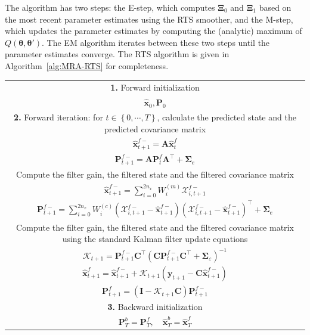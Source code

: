 \documentclass[review,authoryear,3p]{elsarticle}
\begin{document}
The algorithm has two steps: the E-step, which computes $\boldsymbol\Xi_0$ and $\boldsymbol\Xi_1$ based on the most recent parameter estimates using the RTS smoother, and the M-step, which updates the parameter estimates by computing the (analytic) maximum of $Q(\boldsymbol\theta,\boldsymbol\theta')$. The EM algorithm iterates between these two steps until the parameter estimates converge. The RTS  algorithm is given in Algorithm~\ref{alg:MRA-RTS} for completeness. 
\renewcommand{\arraystretch}{1.7}
\begin{table}[!ht]
\begin{tabular}{|c|}\hline
\multicolumn{1}{|p{16cm}|}{\textbf{1.} Forward initialization} \\ 
$\hat{\mathbf x}_0, \mathbf P_0$ \\
\hline
\multicolumn{1}{|p{16cm}|}{\textbf{2.} Forward iteration: for $t\in\left\lbrace 0,\cdots,T\right\rbrace $, calculate the predicted state and the predicted covariance matrix } \\
$\hat{\mathbf x}_{t+1}^{f-}=\mathbf A \hat{\mathbf x}_{t}^{f}$  \\ 
$\mathbf P_{t+1}^{f-}=\mathbf A \mathbf P_{t}^{f}\mathbf A^{\top}+\boldsymbol\Sigma_e$  \\
\multicolumn{1}{|p{16cm}|}{Compute the filter gain, the filtered state and the filtered covariance matrix} \\
$\hat{\mathbf x}_{t+1}^{f-}=\sum_{i=0}^{2n_x} W_i^{(m)}\mathcal X_{i,t+1}^{f-} $ \\
$\mathbf P_{t +1}^{f-}=\sum_{i=0}^{2n_x} W_i^{(c)}(\mathcal X_{i,t+1}^{f-}-\hat{\mathbf x}_{t +1}^{f-})(\mathcal X_{i,t+1}^{f-}-\hat{\mathbf x}_{t +1}^{f-})^\top+\boldsymbol \Sigma_e$ \\ 
\multicolumn{1}{|p{16cm}|}{Compute the filter gain, the filtered state and the filtered covariance matrix using the standard Kalman filter update equations} \\
$\mathcal K_{t+1}=\mathbf P_{t +1}^{f-}\mathbf C ^\top(\mathbf C \mathbf P_{t +1}^{f-}\mathbf C ^\top+\boldsymbol \Sigma_{\varepsilon})^{-1}$\\
$\hat{\mathbf x}_{t+1}^{f}=\hat{\mathbf x}_{t+1}^{f-}+\mathcal K_{t+1}(\mathbf y_{t+1}-\mathbf C\hat{\mathbf x}_{t +1}^{f-})$\\
$\mathbf P_{t+1}^f=(\mathbf I - \mathcal K_{t+1}\mathbf C)\mathbf P_{t +1}^{f-}$\\
\hline
\multicolumn{1}{|p{16cm}|}{\textbf{3.} Backward initialization}\\
 $\mathbf P_T^b= \mathbf P_T^f, \quad \hat{\mathbf x}^b_T= \hat{\mathbf x}^f_T$\\

\end{tabular}
\end{table}
\end{document}
